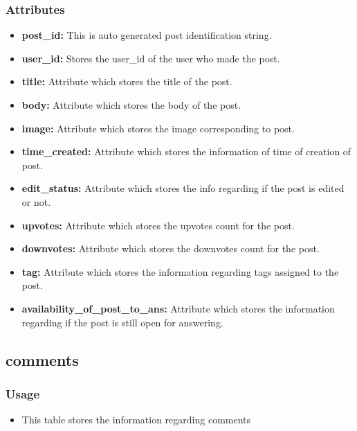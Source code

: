 \documentclass[12pt,a4paper]{article}
\begin{document}
	\subsubsection{Attributes}
	\begin{itemize}
		\item \textbf{post\_id: }This is auto generated post identification string.
		\item \textbf{user\_id: }Stores the user\_id of the user who made the post.
		\item \textbf{title: }Attribute which stores the title of the post.
		\item \textbf{body:} Attribute which stores the body of the post.
		\item \textbf{image: }Attribute which stores the image corresponding to post.
		\item \textbf{time\_created: }Attribute which stores the information of time of creation of post.
		\item \textbf{edit\_status: }Attribute which stores the info regarding if the post is edited or not.
		\item \textbf{upvotes: }Attribute which stores the upvotes count for the post.
		\item \textbf{downvotes: }Attribute which stores the downvotes count for the post.
		\item \textbf{tag: }Attribute which stores the information regarding tags assigned to the post.
		\item \textbf{availability\_of\_post\_to\_ans: }Attribute which stores the information regarding if the post is still open for answering.
	\end{itemize}
	\subsection{comments}
		\subsubsection{Usage}
\begin{itemize}
	\item This table stores the information regarding comments 
\end{itemize}
\end{document}
